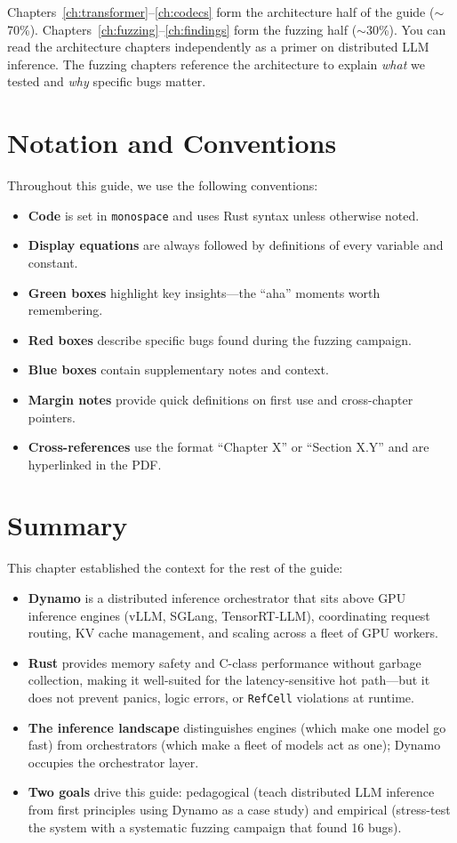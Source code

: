 Chapters~\ref{ch:transformer}--\ref{ch:codecs} form the architecture half of the guide ($\sim$70\%). Chapters~\ref{ch:fuzzing}--\ref{ch:findings} form the fuzzing half ($\sim$30\%). You can read the architecture chapters independently as a primer on distributed LLM inference. The fuzzing chapters reference the architecture to explain \emph{what} we tested and \emph{why} specific bugs matter.

\section{Notation and Conventions}

Throughout this guide, we use the following conventions:
\begin{itemize}
  \item \textbf{Code} is set in \texttt{monospace} and uses Rust syntax unless otherwise noted.
  \item \textbf{Display equations} are always followed by definitions of every variable and constant.
  \item \textbf{Green boxes} highlight key insights---the ``aha'' moments worth remembering.
  \item \textbf{Red boxes} describe specific bugs found during the fuzzing campaign.
  \item \textbf{Blue boxes} contain supplementary notes and context.
  \item {}\textbf{Margin notes} provide quick definitions on first use and cross-chapter pointers.
  \item \textbf{Cross-references} use the format ``Chapter X'' or ``Section X.Y'' and are hyperlinked in the PDF.
\end{itemize}

\section{Summary}

This chapter established the context for the rest of the guide:
\begin{itemize}
  \item \textbf{Dynamo} is a distributed inference orchestrator that sits above GPU inference engines (vLLM, SGLang, TensorRT-LLM), coordinating request routing, KV cache management, and scaling across a fleet of GPU workers.
  \item \textbf{Rust} provides memory safety and C-class performance without garbage collection, making it well-suited for the latency-sensitive hot path---but it does not prevent panics, logic errors, or \texttt{RefCell} violations at runtime.
  \item \textbf{The inference landscape} distinguishes engines (which make one model go fast) from orchestrators (which make a fleet of models act as one); Dynamo occupies the orchestrator layer.
  \item \textbf{Two goals} drive this guide: pedagogical (teach distributed LLM inference from first principles using Dynamo as a case study) and empirical (stress-test the system with a systematic fuzzing campaign that found 16 bugs).
\end{itemize}


